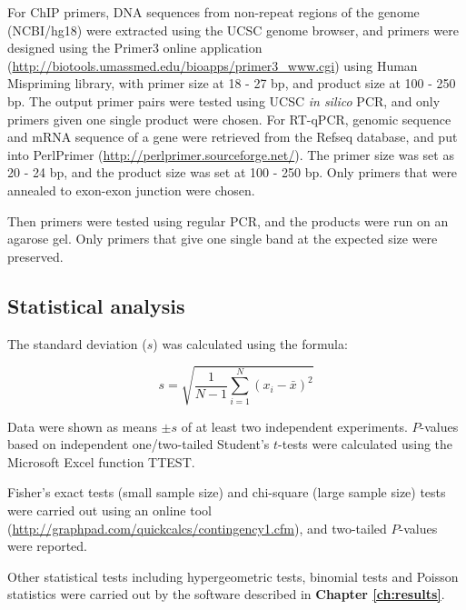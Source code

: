 For ChIP primers, DNA sequences from non-repeat regions of the genome (NCBI/hg18) were extracted using the UCSC genome browser, and primers were designed using the Primer3 online application (\url{http://biotools.umassmed.edu/bioapps/primer3_www.cgi}) using Human Mispriming library, with primer size at 18 - 27 bp, and product size at 100 - 250 bp. The output primer pairs were tested using UCSC \textit{in silico} PCR, and only primers given one single product were chosen. For RT-qPCR, genomic sequence and mRNA sequence of a gene were retrieved from the Refseq database, and put into PerlPrimer (\url{http://perlprimer.sourceforge.net/}).  The primer size was set as 20 - 24 bp, and the product size was set at 100 - 250 bp. Only primers that were annealed to exon-exon junction were chosen.

Then primers were tested using regular PCR, and the products were run on an agarose gel. Only primers that give one single band at the expected size were preserved.

\subsection{Statistical analysis}

The standard deviation ($s$) was calculated using the formula:

\[
s = \sqrt{\frac{1}{N-1}\sum_{i=1}^N(x_i - \bar{x})^2}
\]

Data were shown as means $\pm s$ of at least two independent experiments. $P$-values based on independent one/two-tailed Student's $t$-tests were calculated using the Microsoft Excel function TTEST.

Fisher's exact tests (small sample size) and chi-square (large sample size) tests were carried out using an online tool (\url{http://graphpad.com/quickcalcs/contingency1.cfm}), and two-tailed $P$-values were reported.

Other statistical tests including hypergeometric tests, binomial tests and Poisson statistics were carried out by the software described in \textbf{Chapter \ref{ch:results}}.
